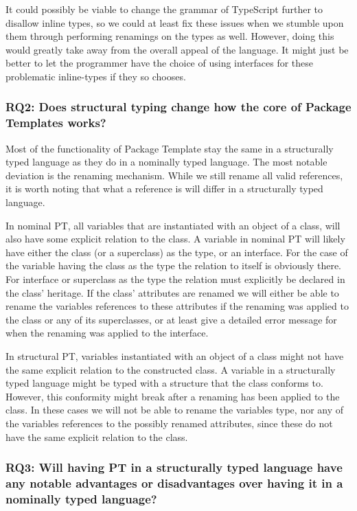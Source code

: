 It could possibly be viable to change the grammar of TypeScript further to disallow inline types, so we could at least fix these issues when we stumble upon them through performing renamings on the types as well.
However, doing this would greatly take away from the overall appeal of the language.
It might just be better to let the programmer have the choice of using interfaces for these problematic inline-types if they so chooses.

\subsubsection{RQ2: Does structural typing change how the core of Package Templates works?}

Most of the functionality of Package Template stay the same in a structurally typed language as they do in a nominally typed language.
The most notable deviation is the renaming mechanism.
While we still rename all valid references, it is worth noting that what a reference is will differ in a structurally typed language.

In nominal PT, all variables that are instantiated with an object of a class, will also have some explicit relation to the class.
A variable in nominal PT will likely have either the class (or a superclass) as the type, or an interface.
For the case of the variable having the class as the type the relation to itself is obviously there.
For interface or superclass as the type the relation must explicitly be declared in the class' heritage.
If the class' attributes are renamed we will either be able to rename the variables references to these attributes if the renaming was applied to the class or any of its superclasses, or at least give a detailed error message for when the renaming was applied to the interface.

In structural PT, variables instantiated with an object of a class might not have the same explicit relation to the constructed class.
A variable in a structurally typed language might be typed with a structure that the class conforms to.
However, this conformity might break after a renaming has been applied to the class.
In these cases we will not be able to rename the variables type, nor any of the variables references to the possibly renamed attributes, since these do not have the same explicit relation to the class.

\subsubsection{RQ3: Will having PT in a structurally typed language have any notable advantages or disadvantages over having it in a nominally typed language?}

